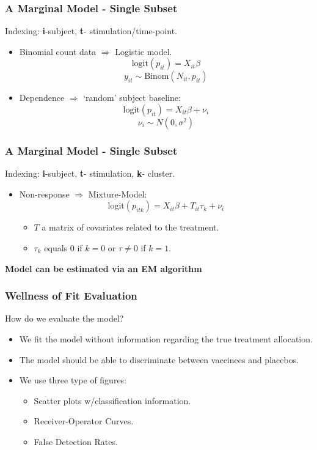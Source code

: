 \documentclass{beamer}
\theoremstyle{definition}
\begin{document}
\begin{frame}
\frametitle{A Marginal Model - Single Subset}
\begin{framed}
Indexing: \textbf{i}-subject, \textbf{t}- stimulation/time-point.
\end{framed}

\begin{itemize}
\item Binomial count data $\Rightarrow$ Logistic model.
$$
\text{logit}(p_{it}) = X_{it} \beta
$$$$
y_{it} \sim \text{Binom}(N_{it}, p_{it})
$$

\pause
\item Dependence $\Rightarrow$ `random' subject baseline:
$$
\text{logit}(p_{it}) = X_{it} \beta + \nu_i
$$$$
\nu_i \sim N(0, \sigma^{2})
$$
\end{itemize}
\end{frame}


\begin{frame}
\frametitle{A Marginal Model - Single Subset}
\begin{framed}
Indexing: \textbf{i}-subject, \textbf{t}- stimulation, \textbf{k}- cluster.
\end{framed}

\begin{itemize}
\item Non-response $\Rightarrow$ Mixture-Model:
$$
\text{logit}(p_{itk}) = X_{it} \beta + T_{it}\tau_{k} + \nu_i
$$
	\begin{itemize}
	\item $T$ a matrix of covariates related to the treatment.
	\item $\tau_k$ equals $0$ if $k=0$ or $\tau\neq0$ if $k = 1$.
	\end{itemize}
\end{itemize}

\pause
\vspace{0.3 cm}
\textbf{Model can be estimated via an EM algorithm}
\end{frame}


\begin{frame}
\frametitle{Wellness of Fit Evaluation}
How do we evaluate the model?
\begin{itemize}
\item We fit the model without information regarding the true treatment allocation. 
\vspace{0.3 cm}
\item The model should be able to discriminate between vaccinees and placebos.
\vspace{0.3 cm}
\pause
\item We use three type of figures:
	\begin{itemize}
	\item Scatter plots w/classification information.
	\item Receiver-Operator Curves.
	\item False Detection Rates. 
	\end{itemize}
\end{itemize}
\end{frame}
\end{document}

